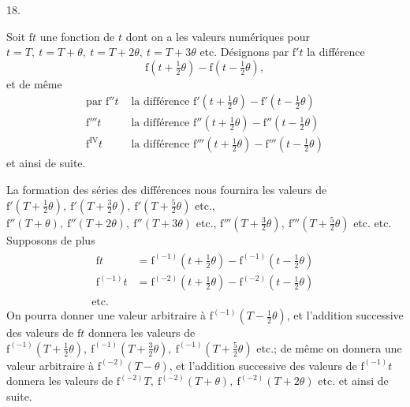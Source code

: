\par\begingroup
\setlength{\lineskip}{4pt}\setlength{\lineskiplimit}{4pt}
\bigskip
{}
\begin{center}18.\end{center}
\noindent\hspace*{\parindent}Soit \(\mathrm{f}t\) une fonction de \(t\) dont on a les valeurs numériques pour \(t=T,\ t=T+\theta,\ t=T+2\theta,\ t=T+3\theta\) etc. Désignons par \(\mathrm{f}'t\) la différence
\[
\mathrm{f}(t+\tfrac12\theta)-\mathrm{f}(t-\tfrac12\theta),
\]
et de même
\[
\begin{aligned}
\text{par }\mathrm{f}''t&\text{ la différence }\mathrm{f}'(t+\tfrac12\theta)-\mathrm{f}'(t-\tfrac12\theta)\\
\mathrm{f}'''t&\text{ la différence }\mathrm{f}''(t+\tfrac12\theta)-\mathrm{f}''(t-\tfrac12\theta)\\
\mathrm{f}^{\mathrm{IV}}t&\text{ la différence }\mathrm{f}'''(t+\tfrac12\theta)-\mathrm{f}'''(t-\tfrac12\theta)
\end{aligned}
\]
et ainsi de suite.
\par La formation des séries des différences nous fournira les valeurs de \(\mathrm{f}'(T+\tfrac12\theta),\ \mathrm{f}'(T+\tfrac32\theta),\ \mathrm{f}'(T+\tfrac52\theta)\) etc., \(\mathrm{f}''(T+\theta),\ \mathrm{f}''(T+2\theta),\ \mathrm{f}''(T+3\theta)\) etc., \(\mathrm{f}'''(T+\tfrac32\theta),\ \mathrm{f}'''(T+\tfrac52\theta)\) etc. etc. Supposons de plus
\[
\begin{gathered}
\begin{aligned}
\mathrm{f}t&=\mathrm{f}^{(-1)}(t+\tfrac12\theta)-\mathrm{f}^{(-1)}(t-\tfrac12\theta)\\
\mathrm{f}^{(-1)}t&=\mathrm{f}^{(-2)}(t+\tfrac12\theta)-\mathrm{f}^{(-2)}(t-\tfrac12\theta)
\end{aligned}\\
\text{etc.}
\end{gathered}
\]
On pourra donner une valeur arbitraire à \(\mathrm{f}^{(-1)}(T-\tfrac12\theta)\), et l’addition successive des valeurs de \(\mathrm{f}t\) donnera les valeurs de \(\mathrm{f}^{(-1)}(T+\tfrac12\theta),\ \mathrm{f}^{(-1)}(T+\tfrac32\theta),\ \mathrm{f}^{(-1)}(T+\tfrac52\theta)\) etc.; de même on donnera une valeur arbitraire à \(\mathrm{f}^{(-2)}(T-\theta)\), et l’addition successive des valeurs de \(\mathrm{f}^{(-1)}t\) donnera les valeurs de \(\mathrm{f}^{(-2)}T,\ \mathrm{f}^{(-2)}(T+\theta),\ \mathrm{f}^{(-2)}(T+2\theta)\) etc. et ainsi de suite.
